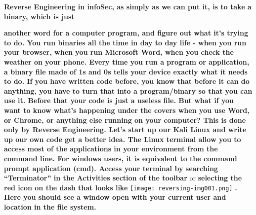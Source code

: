 \textbf{Reverse Engineering in infoSec, as simply as we can put it, is to take a
}\textbf{\textcolor[rgb]{0.21960784,0.4627451,0.11372549}{binary, }}\textbf{which is just }

\textbf{another word for a computer program, and figure out what it's trying to do. You run binaries all the time in day
to day life - when you run your browser, when you run Microsoft Word, when you check the weather on your phone. Every
time you run a program or application, a binary file made of 1s and 0s tells your device exactly what it needs to do.
\newline
\newline
If you have written code before, you know that before it can do anything, you have to turn that into a program/binary so
that you can use it. Before that your code is just a useless file. But what if you want to know what's happening under
the covers when you use Word, or Chrome, or anything else running on your computer? This is done only by Reverse
Engineering.  \newline
\newline
Let's start up our Kali Linux and write up our own code get a better idea. The Linux terminal allow you to access most
of the applications in your environment from the command line. For windows users, it is equivalent to the command
prompt application (cmd). Access your terminal by searching ``Terminator'' in the Activities section of the toolbar
}or\textbf{ selecting the red icon on the dash that looks like }
\texttt{[image: reversing-img001.png]}
 \textbf{. Here you should see a window open with your current user and location in the file system.\newline
}

